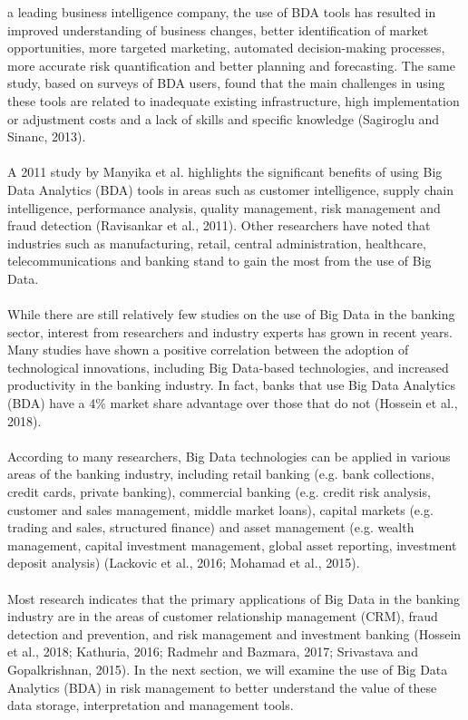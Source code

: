 a leading business intelligence company, the use of BDA tools has resulted in improved understanding of business
changes, better identification of market opportunities, more targeted marketing, automated decision-making
processes, more accurate risk quantification and better planning and forecasting. The same study, based on
surveys of BDA users, found that the main challenges in using these tools are related to inadequate existing
infrastructure, high implementation or adjustment costs and a lack of skills and specific knowledge
(Sagiroglu and Sinanc, 2013).\\\\
A 2011 study by Manyika et al. highlights the significant benefits of using Big Data Analytics (BDA) tools in areas
such as customer intelligence, supply chain intelligence, performance analysis, quality management, risk management
and fraud detection (Ravisankar et al., 2011). Other researchers have noted that industries such as manufacturing,
retail, central administration, healthcare, telecommunications and banking stand to gain the most from the use of
Big Data.\\\\
While there are still relatively few studies on the use of Big Data in the banking sector, interest from researchers
and industry experts has grown in recent years. Many studies have shown a positive correlation between the adoption
of technological innovations, including Big Data-based technologies, and increased productivity in the banking
industry. In fact, banks that use Big Data Analytics (BDA) have a 4\% market share advantage over those that do
not (Hossein et al., 2018).\\\\
According to many researchers, Big Data technologies can be applied in various areas of the banking industry,
including retail banking (e.g. bank collections, credit cards, private banking), commercial banking
(e.g. credit risk analysis, customer and sales management, middle market loans), capital markets
(e.g. trading and sales, structured finance) and asset management (e.g. wealth management, capital investment
management, global asset reporting, investment deposit analysis) (Lackovic et al., 2016; Mohamad et al., 2015).\\\\
Most research indicates that the primary applications of Big Data in the banking industry are in the areas of
customer relationship management (CRM), fraud detection and prevention, and risk management and investment
banking (Hossein et al., 2018; Kathuria, 2016; Radmehr and Bazmara, 2017; Srivastava and Gopalkrishnan, 2015).
In the next section, we will examine the use of Big Data Analytics (BDA) in risk management to better understand
the value of these data storage, interpretation and management tools.


